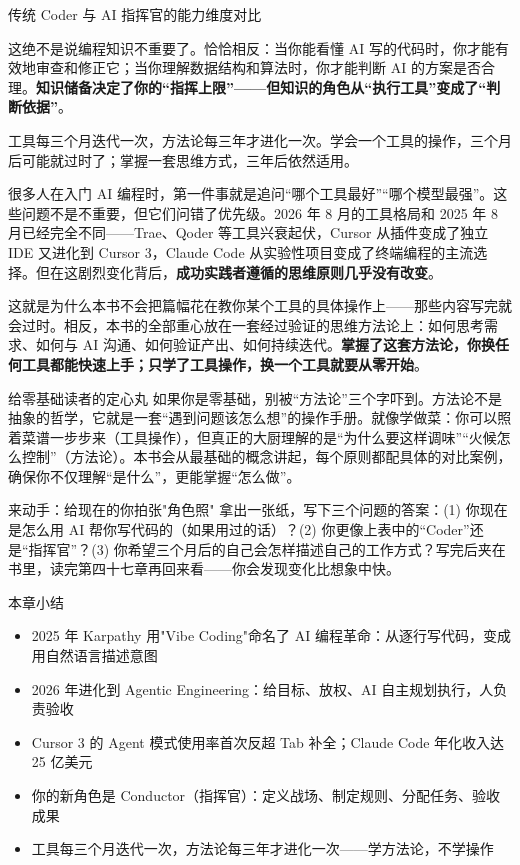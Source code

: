 \begin{center}\small\color{gray}传统 Coder 与 AI 指挥官的能力维度对比\end{center}

这绝不是说编程知识不重要了。恰恰相反：当你能看懂 AI 写的代码时，你才能有效地审查和修正它；当你理解数据结构和算法时，你才能判断 AI 的方案是否合理。\textbf{知识储备决定了你的“指挥上限”——但知识的角色从“执行工具”变成了“判断依据”}。


工具每三个月迭代一次，方法论每三年才进化一次。学会一个工具的操作，三个月后可能就过时了；掌握一套思维方式，三年后依然适用。

很多人在入门 AI 编程时，第一件事就是追问“哪个工具最好”“哪个模型最强”。这些问题不是不重要，但它们问错了优先级。2026 年 8 月的工具格局和 2025 年 8 月已经完全不同——Trae、Qoder 等工具兴衰起伏，Cursor 从插件变成了独立 IDE 又进化到 Cursor 3，Claude Code 从实验性项目变成了终端编程的主流选择。但在这剧烈变化背后，\textbf{成功实践者遵循的思维原则几乎没有改变}。

这就是为什么本书不会把篇幅花在教你某个工具的具体操作上——那些内容写完就会过时。相反，本书的全部重心放在一套经过验证的思维方法论上：如何思考需求、如何与 AI 沟通、如何验证产出、如何持续迭代。\textbf{掌握了这套方法论，你换任何工具都能快速上手；只学了工具操作，换一个工具就要从零开始}。

\begin{tcbinfo}{给零基础读者的定心丸}
如果你是零基础，别被“方法论”三个字吓到。方法论不是抽象的哲学，它就是一套“遇到问题该怎么想”的操作手册。就像学做菜：你可以照着菜谱一步步来（工具操作），但真正的大厨理解的是“为什么要这样调味”“火候怎么控制”（方法论）。本书会从最基础的概念讲起，每个原则都配具体的对比案例，确保你不仅理解“是什么”，更能掌握“怎么做”。

\end{tcbinfo}

\begin{tcbpractice}{来动手：给现在的你拍张"角色照"}
拿出一张纸，写下三个问题的答案：(1) 你现在是怎么用 AI 帮你写代码的（如果用过的话）？(2) 你更像上表中的“Coder”还是“指挥官”？(3) 你希望三个月后的自己会怎样描述自己的工作方式？写完后夹在书里，读完第四十七章再回来看——你会发现变化比想象中快。

\end{tcbpractice}

\begin{tcbsummary}{本章小结}
\begin{itemize}
  \item 2025 年 Karpathy 用"Vibe Coding"命名了 AI 编程革命：从逐行写代码，变成用自然语言描述意图
  \item 2026 年进化到 Agentic Engineering：给目标、放权、AI 自主规划执行，人负责验收
  \item Cursor 3 的 Agent 模式使用率首次反超 Tab 补全；Claude Code 年化收入达 25 亿美元
  \item 你的新角色是 Conductor（指挥官）：定义战场、制定规则、分配任务、验收成果
  \item 工具每三个月迭代一次，方法论每三年才进化一次——学方法论，不学操作
\end{itemize}

\end{tcbsummary}
